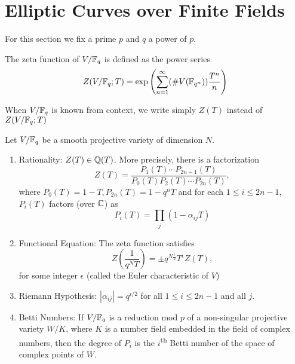 \section{Elliptic Curves over Finite Fields}

For this section we fix a prime $p$ and $q$ a power of $p$.

\begin{definition}
	The zeta function of $V/\mathbb{F}_q$ is defined as the power series
	\begin{equation*}
		Z(V/\mathbb{F}_q; T) = \exp\left(\sum_{n=1}^\infty (\#V(\mathbb{F}_{q^n}))
		\frac{T^n}{n}\right)
	\end{equation*}
\end{definition}

\begin{notation}
	When $V/\mathbb{F}_q$ is known from context, we write simply $Z(T)$
	instead of $Z(V/\mathbb{F}_q; T)$
\end{notation}

\begin{theorem}
	\label{thm:weil}
	Let $V/\mathbb{F}_q$ be a smooth projective variety of dimension $N$.
	\begin{enumerate}[label=(\alph*)]
		\item Rationality: $Z(T) \in \mathbb{Q}(T)$. More precisely, 
			there is a factorization
			\begin{equation*}
				Z(T) = \frac{P_1(T)\cdots P_{2n-1}(T)}
				{P_0(T)P_2(T) \cdots P_{2n}(T)},
			\end{equation*}
			where $P_0(T) = 1 - T, P_{2n}(T) = 1 - q^nT$ and for each
			$1 \leq i \leq 2n - 1$, $P_i(T)$ factors (over $\mathbb{C}$) as
			\begin{equation*}
				P_i(T) = \prod_j (1 - \alpha_{ij}T)
			\end{equation*}
		\item Functional Equation: The zeta function satisfies
			\begin{equation*}
				Z\left(\frac{1}{q^NT}\right) = \pm q^{N\frac{\epsilon}{2}}
				T^{\epsilon} Z(T),
			\end{equation*}
			for some integer $\epsilon$ (called the Euler characteristic of $V$)
		\item Riemann Hypothesis: $|\alpha_{ij}| = q^{i/2}$
			for all $1 \leq i \leq 2n - 1$ and all $j$.
		\item Betti Numbers: If $V/\mathbb{F}_q$ is a reduction mod $p$ of a
			non-singular projective variety $W/K$, where $K$ is a number
			field embedded in the field of complex numbers, then the degree
			of $P_i$ is the $i$\textsuperscript{th} Betti number of the space
			of complex points of $W$.
	\end{enumerate}
\end{theorem}

